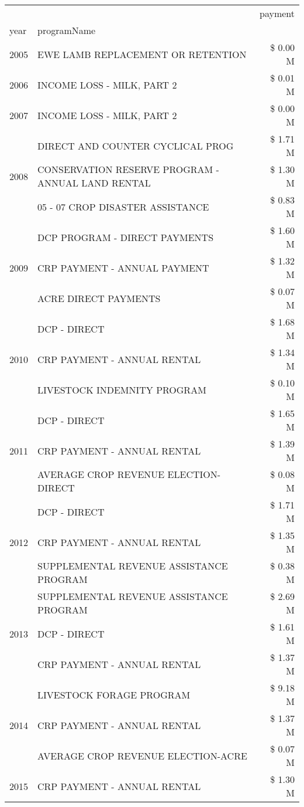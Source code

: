 \begin{tabular}{llr}
\toprule
 &  & payment \\
year & programName &  \\
\midrule
2005 & EWE LAMB REPLACEMENT OR RETENTION & \$ 0.00 M \\
\cline{1-3}
2006 & INCOME LOSS - MILK, PART 2 & \$ 0.01 M \\
\cline{1-3}
2007 & INCOME LOSS - MILK, PART 2 & \$ 0.00 M \\
\cline{1-3}
\multirow[t]{3}{*}{2008} & DIRECT AND COUNTER CYCLICAL PROG & \$ 1.71 M \\
 & CONSERVATION RESERVE PROGRAM - ANNUAL LAND RENTAL & \$ 1.30 M \\
 & 05 - 07 CROP DISASTER ASSISTANCE & \$ 0.83 M \\
\cline{1-3}
\multirow[t]{3}{*}{2009} & DCP PROGRAM - DIRECT PAYMENTS & \$ 1.60 M \\
 & CRP PAYMENT - ANNUAL PAYMENT & \$ 1.32 M \\
 & ACRE DIRECT PAYMENTS & \$ 0.07 M \\
\cline{1-3}
\multirow[t]{3}{*}{2010} & DCP - DIRECT & \$ 1.68 M \\
 & CRP PAYMENT - ANNUAL RENTAL & \$ 1.34 M \\
 & LIVESTOCK INDEMNITY PROGRAM & \$ 0.10 M \\
\cline{1-3}
\multirow[t]{3}{*}{2011} & DCP - DIRECT & \$ 1.65 M \\
 & CRP PAYMENT - ANNUAL RENTAL & \$ 1.39 M \\
 & AVERAGE CROP REVENUE ELECTION-DIRECT & \$ 0.08 M \\
\cline{1-3}
\multirow[t]{3}{*}{2012} & DCP - DIRECT & \$ 1.71 M \\
 & CRP PAYMENT - ANNUAL RENTAL & \$ 1.35 M \\
 & SUPPLEMENTAL REVENUE ASSISTANCE PROGRAM & \$ 0.38 M \\
\cline{1-3}
\multirow[t]{3}{*}{2013} & SUPPLEMENTAL REVENUE ASSISTANCE PROGRAM & \$ 2.69 M \\
 & DCP - DIRECT & \$ 1.61 M \\
 & CRP PAYMENT - ANNUAL RENTAL & \$ 1.37 M \\
\cline{1-3}
\multirow[t]{3}{*}{2014} & LIVESTOCK FORAGE PROGRAM & \$ 9.18 M \\
 & CRP PAYMENT - ANNUAL RENTAL & \$ 1.37 M \\
 & AVERAGE CROP REVENUE ELECTION-ACRE & \$ 0.07 M \\
\cline{1-3}
\multirow[t]{3}{*}{2015} & CRP PAYMENT - ANNUAL RENTAL & \$ 1.30 M \\

\end{tabular}
